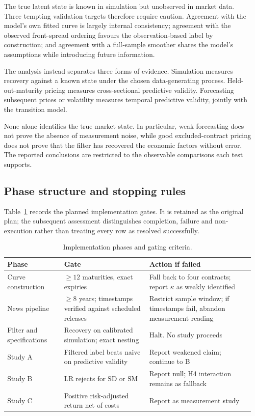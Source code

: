 \documentclass[journal]{IEEEtran}
\begin{document}
The true latent state is known in simulation but unobserved in market data. Three tempting validation targets therefore require caution. Agreement with the model's own fitted curve is largely internal consistency; agreement with the observed front-spread ordering favours the observation-based label by construction; and agreement with a full-sample smoother shares the model's assumptions while introducing future information.

The analysis instead separates three forms of evidence. Simulation measures recovery against a known state under the chosen data-generating process. Held-out-maturity pricing measures cross-sectional predictive validity. Forecasting subsequent prices or volatility measures temporal predictive validity, jointly with the transition model.

None alone identifies the true market state. In particular, weak forecasting does not prove the absence of measurement noise, while good excluded-contract pricing does not prove that the filter has recovered the economic factors without error. The reported conclusions are restricted to the observable comparisons each test supports.

\subsection{Phase structure and stopping rules}

Table~\ref{tab:phases} records the planned implementation gates. It is retained as the original plan; the subsequent assessment distinguishes completion, failure and non-execution rather than treating every row as resolved successfully.
\begin{table}[H]
\centering
\caption{Implementation phases and gating criteria.}
\label{tab:phases}
\small
\setlength{\tabcolsep}{3.5pt}
\renewcommand{\arraystretch}{1.18}
\begin{tabular}{@{}p{2.05cm}p{2.6cm}p{2.85cm}@{}}
\toprule
\textbf{Phase} & \textbf{Gate} & \textbf{Action if failed} \\
\midrule
Curve construction & $\geq 12$ maturities, exact expiries & Fall back to four contracts; report $\kappa$ as weakly identified \\
News pipeline & $\geq 8$ years; timestamps verified against scheduled releases & Restrict sample window; if timestamps fail, abandon measurement reading \\
Filter and specifications & Recovery on calibrated simulation; exact nesting & Halt. No study proceeds \\
Study A & Filtered label beats naive on predictive validity & Report weakened claim; continue to B \\
Study B & LR rejects for $\mathrm{SD}$ or $\mathrm{SM}$ & Report null; H4 interaction remains as fallback \\
Study C & Positive risk-adjusted return net of costs & Report as measurement study \\
\bottomrule
\end{tabular}
\end{table}
\end{document}
